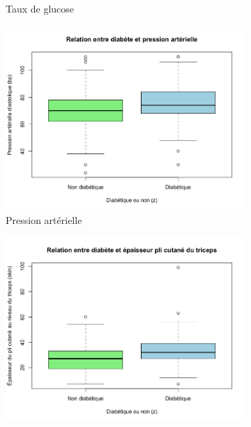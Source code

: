 \documentclass[a4paper,11pt]{report}
\begin{document}
\begin{figure}[H]
\begin{subfigure}[b]{0.25\linewidth}
		\caption{\scriptsize Taux de glucose}
		\label{fig:1-3-2-boxplot-diabete-glucose}
	\end{subfigure}%
	\begin{subfigure}[b]{0.25\linewidth}
		\centering
		\captionsetup{justification=centering}
		\includegraphics[width=1\linewidth]{img/1-3-2-boxplot-diabete-pression-arterielle}
		\caption{\scriptsize Pression artérielle}
		\label{fig:1-3-2-boxplot-diabete-pression-arterielle}
	\end{subfigure}%
	\begin{subfigure}[b]{0.25\linewidth}
		\centering
		\captionsetup{justification=centering}
		\includegraphics[width=1\linewidth]{img/1-3-2-boxplot-diabete-pli-cutane}

\end{subfigure}
\end{figure}
\end{document}
